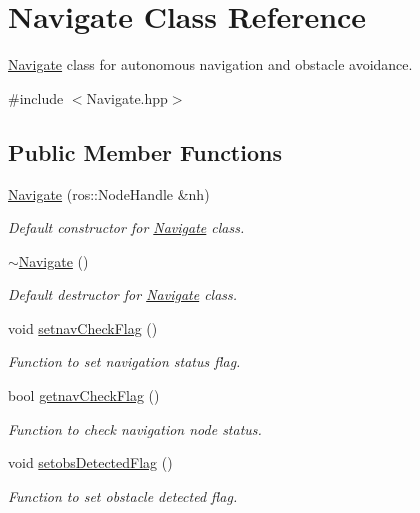 \hypertarget{classNavigate}{}\section{Navigate Class Reference}
\label{classNavigate}


\hyperlink{classNavigate}{Navigate} class for autonomous navigation and obstacle avoidance.  




{\ttfamily \#include $<$Navigate.\+hpp$>$}

\subsection*{Public Member Functions}
\begin{DoxyCompactItemize}
\item 
\hyperlink{classNavigate_a50311e85cf90e124f2bc254e8a656d2a}{Navigate} (ros\+::\+Node\+Handle \&nh)
\begin{DoxyCompactList}\small\item\em Default constructor for \hyperlink{classNavigate}{Navigate} class. \end{DoxyCompactList}\item 
\hyperlink{classNavigate_a317644b5d983dae7ec3fcb6298ee0f39}{$\sim$\+Navigate} ()
\begin{DoxyCompactList}\small\item\em Default destructor for \hyperlink{classNavigate}{Navigate} class. \end{DoxyCompactList}\item 
void \hyperlink{classNavigate_aca18fbf7e83ce73fe6109476a168a164}{setnav\+Check\+Flag} ()
\begin{DoxyCompactList}\small\item\em Function to set navigation status flag. \end{DoxyCompactList}\item 
bool \hyperlink{classNavigate_ae6e9f93c97a258e45c3bc699aba51c78}{getnav\+Check\+Flag} ()
\begin{DoxyCompactList}\small\item\em Function to check navigation node status. \end{DoxyCompactList}\item 
void \hyperlink{classNavigate_a81460d33e93df93c9ce9b5497c661a37}{setobs\+Detected\+Flag} ()
\begin{DoxyCompactList}\small\item\em Function to set obstacle detected flag. \end{DoxyCompactList}\item 

\end{DoxyCompactItemize}
